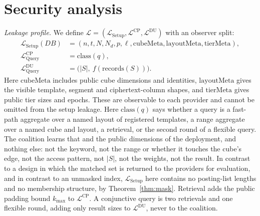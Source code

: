 \documentclass[a4paper,fleqn]{cas-sc}
\newcommand{\Leak}{\mathcal{L}}
\begin{document}
\section{Security analysis}
\label{sec:security}

\emph{Leakage profile.} We define
$\Leak=(\Leak_{\mathrm{Setup}},\Leak^{\text{CP}},\Leak^{\text{DU}})$ with an
observer split:
\begin{align*}
\Leak_{\mathrm{Setup}}(DB) &=
(n,t,N,N_d,p,\ell,\mathrm{cubeMeta},\mathrm{layoutMeta},\mathrm{tierMeta}),\\
\Leak^{\text{CP}}_{\mathrm{Query}} &= \mathrm{class}(q),\\
\Leak^{\text{DU}}_{\mathrm{Query}} &= \big(|S|,\ f(\mathrm{records}(S))\big).
\end{align*}
Here $\mathrm{cubeMeta}$ includes public cube dimensions and identities,
$\mathrm{layoutMeta}$ gives the visible template, segment and ciphertext-column
shapes, and $\mathrm{tierMeta}$ gives public tier sizes and epochs.
These are observable to each provider and cannot be omitted from the
setup leakage. Here $\mathrm{class}(q)$ says whether a query is a fast-path aggregate over a
named layout of registered templates, a range aggregate over a named cube and
layout, a retrieval, or the second round of a flexible query. The coalition
learns that and the public dimensions of the deployment, and nothing else: not
the keyword, not the range or whether it touches the cube's edge, not the
access pattern, not $|S|$, not the weights, not the result. In contrast to a design in which
the matched set is returned to the providers for evaluation, and in contrast
to an unmasked index, $\Leak_{\mathrm{Setup}}$ here contains no posting-list
lengths and no membership structure, by Theorem~\ref{thm:mask}. Retrieval adds
the public padding bound $k_{\max}$ to $\Leak^{\text{CP}}$. A conjunctive
query is two retrievals and one flexible round, adding only result sizes to
$\Leak^{\text{DU}}$, never to the coalition.
\end{document}
